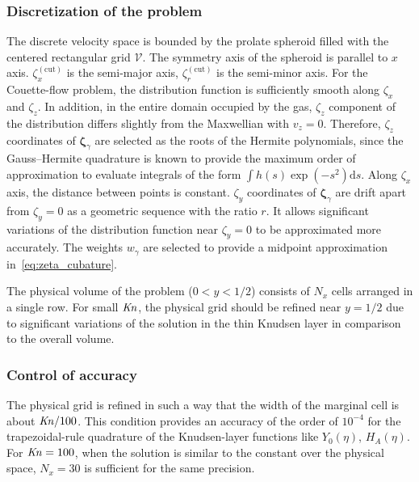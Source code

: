 \documentclass[]{jfm}
\newcommand{\Kn}{\mbox{\textit{Kn}}}
\newcommand{\dd}{\mathrm{d}}
\newcommand{\bzeta}{\boldsymbol{\zeta}}
\begin{document}
\subsubsection{Discretization of the problem}

The discrete velocity space is bounded by the prolate spheroid
filled with the centered rectangular grid \(\mathcal{V}\).
The symmetry axis of the spheroid is parallel to \(x\) axis.
\(\zeta^{(\mathrm{cut})}_x\) is the semi-major axis, \(\zeta^{(\mathrm{cut})}_r\) is the semi-minor axis.
For the Couette-flow problem, the distribution function is sufficiently smooth along \(\zeta_x\) and \(\zeta_z\).
In addition, in the entire domain occupied by the gas, \(\zeta_z\) component of the distribution
differs slightly from the Maxwellian with \(v_z=0\).
Therefore, \(\zeta_z\) coordinates of \(\bzeta_\gamma\) are selected as the roots of the Hermite polynomials,
since the Gauss--Hermite quadrature is known to provide the maximum order of approximation
to evaluate integrals of the form \(\int h(s)\exp(-s^2)\dd{s}\).
Along \(\zeta_x\) axis, the distance between points is constant.
\(\zeta_y\) coordinates of \(\bzeta_\gamma\) are drift apart from \(\zeta_y=0\)
as a geometric sequence with the ratio \(r\).
It allows significant variations of the distribution function near \(\zeta_y=0\) to be approximated more accurately.
The weights \(w_\gamma\) are selected to provide a midpoint approximation in~\eqref{eq:zeta_cubature}.

The physical volume of the problem (\(0<y<1/2\)) consists of \(N_x\) cells arranged in a single row.
For small \(\Kn\), the physical grid should be refined near \(y=1/2\)
due to significant variations of the solution in the thin Knudsen layer in comparison to the overall volume.

\subsubsection{Control of accuracy}

The physical grid is refined in such a way
that the width of the marginal cell is about \(\Kn/100\).
This condition provides an accuracy of the order of \(10^{-4}\) for the trapezoidal-rule quadrature
of the Knudsen-layer functions like \(Y_0(\eta)\), \(H_A(\eta)\).
For \(\Kn=100\), when the solution is similar to the constant over the physical space,
\(N_x = 30\) is sufficient for the same precision.
\end{document}
